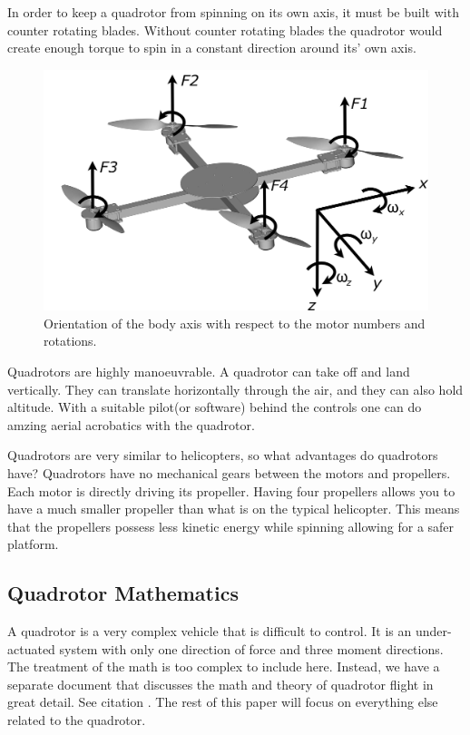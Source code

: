 \documentclass{article}
\numberwithin{equation}{section} %
\begin{document}
In order to keep a quadrotor from spinning on its own axis, it must be built with counter rotating blades. Without counter rotating blades the quadrotor would create enough torque to spin in a constant direction around its' own axis.

\begin{figure}[h!]
  \centering
	\includegraphics[scale=.05]{reference_frame_diagram.jpg}
  \caption{Orientation of the body axis with respect to the motor numbers and rotations.}
\end{figure}  

Quadrotors are highly manoeuvrable. A quadrotor can take off and land vertically. They can translate horizontally through the air, and they can also hold altitude. With a suitable pilot(or software) behind the controls one can do amzing aerial acrobatics with the quadrotor.

Quadrotors are very similar to helicopters, so what advantages do quadrotors have? Quadrotors have no mechanical gears between the motors and propellers. Each motor is directly driving its propeller. Having four propellers allows you to have a much smaller propeller than what is on the typical helicopter. This means that the propellers possess less kinetic energy while spinning allowing for a safer platform.

\subsection{Quadrotor Mathematics}
A quadrotor is a very complex vehicle that is difficult to control. It is an under-actuated system with only one direction of force and three moment directions. The treatment of the math is too complex to include here. Instead, we have a separate document that discusses the math and theory of quadrotor flight in great detail. See citation \cite{anzhelka_math}. The rest of this paper will focus on everything else related to the quadrotor.
\end{document}
